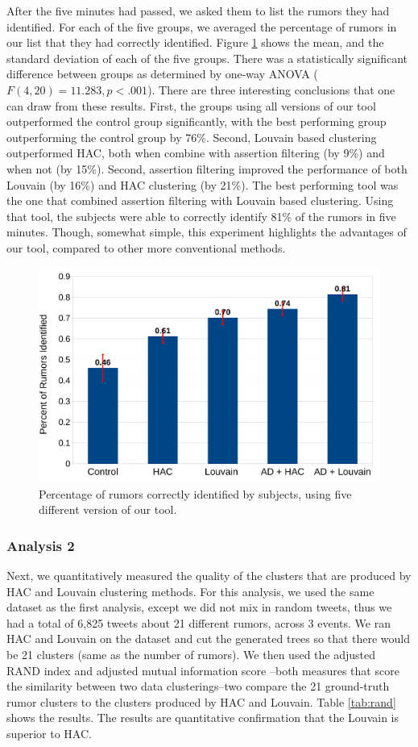 \documentclass[letterpaper]{article}
\begin{document}
After the five minutes had passed, we asked them to list the rumors they had identified. For each of the five groups, we averaged the percentage of rumors in our list that they had correctly identified. Figure \ref{fig:res1} shows the mean, and the standard deviation of each of the five groups. There was a statistically significant difference between groups as determined by one-way ANOVA ($F(4,20) = 11.283, p < .001$). There are three interesting conclusions that one can draw from these results. First, the groups using all versions of our tool outperformed the control group significantly, with the best performing group outperforming the control group by 76\%. Second, Louvain based clustering outperformed HAC, both when combine with assertion filtering (by 9\%) and when not (by 15\%). Second, assertion filtering improved the performance of both Louvain (by 16\%) and HAC clustering (by 21\%). The best performing tool was the one that combined assertion filtering with Louvain based clustering. Using that tool, the subjects were able to correctly identify 81\% of the rumors in five minutes. Though, somewhat simple, this experiment highlights the advantages of our tool, compared to other more conventional methods.




\begin{figure}[htb]
\centering
\includegraphics[width=.80\columnwidth]{rd_eval_nt.pdf}
\caption{Percentage of rumors correctly identified by subjects, using five different version of our tool.}
\label{fig:res1}
\end{figure}

\subsubsection{Analysis 2}
Next, we quantitatively measured the quality of the clusters that are produced by HAC and Louvain clustering methods. For this analysis, we used the same dataset as the first analysis, except we did not mix in random tweets, thus we had a total of 6,825 tweets about 21 different rumors, across 3 events. We ran HAC and Louvain on the dataset and cut the generated trees so that there would be 21 clusters (same as the number of rumors). We then used the adjusted RAND index \cite{rand1971objective} and adjusted mutual information score \cite{vinh2010information}--both measures that score the similarity between two data clusterings--two compare the 21 ground-truth rumor clusters to the clusters produced by HAC and Louvain. Table \ref{tab:rand} shows the results. The results are quantitative confirmation that the Louvain is superior to HAC.
\end{document}
